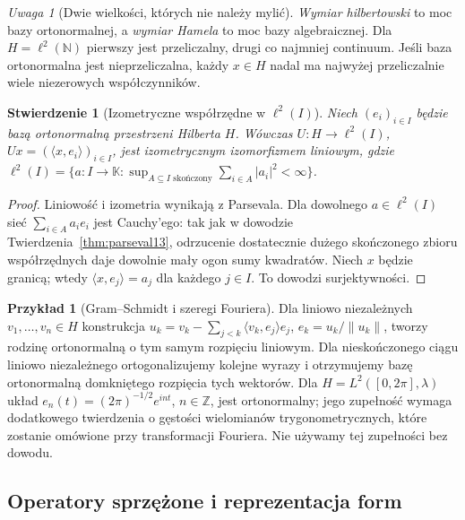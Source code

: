 \documentclass[11pt,a4paper]{article}
\numberwithin{equation}{section}
\theoremstyle{plain}
\newtheorem{stwierdzenie}[twierdzenie]{Stwierdzenie}
\theoremstyle{definition}
\newtheorem{przyklad}[twierdzenie]{Przykład}
\theoremstyle{remark}
\newtheorem{uwaga}[twierdzenie]{Uwaga}
\newcommand{\N}{\mathbb N}
\newcommand{\K}{\mathbb K}
\begin{document}
\begin{uwaga}[Dwie wielkości, których nie należy mylić]
\label{rem:hamel-vs-hilbert13}
\emph{Wymiar hilbertowski} to moc bazy ortonormalnej,
a \emph{wymiar Hamela} to moc bazy algebraicznej.
Dla $H=\ell^2(\N)$ pierwszy jest przeliczalny, drugi
co najmniej continuum. Jeśli baza ortonormalna jest
nieprzeliczalna, każdy $x\in H$ nadal ma najwyżej
przeliczalnie wiele niezerowych współczynników.
\end{uwaga}

\begin{stwierdzenie}[Izometryczne współrzędne w $\ell^2(I)$]
\label{prop:hilbert-l2I13}
Niech $(e_i)_{i\in I}$ będzie bazą ortonormalną przestrzeni
Hilberta $H$. Wówczas $U:H\to\ell^2(I)$,
$Ux=(\langle x,e_i\rangle)_{i\in I}$, jest izometrycznym
izomorfizmem liniowym, gdzie
$\ell^2(I)=\{a:I\to\K:\sup_{A\subseteq I\text{ skończony}}
\sum_{i\in A}|a_i|^2<\infty\}$.
\end{stwierdzenie}
\begin{proof}
Liniowość i izometria wynikają z Parsevala. Dla dowolnego
$a\in\ell^2(I)$ sieć $\sum_{i\in A}a_ie_i$ jest Cauchy'ego:
tak jak w dowodzie Twierdzenia~\ref{thm:parseval13},
odrzucenie dostatecznie dużego skończonego zbioru współrzędnych
daje dowolnie mały ogon sumy kwadratów. Niech $x$ będzie granicą;
wtedy $\langle x,e_j\rangle=a_j$ dla każdego $j\in I$.
To dowodzi surjektywności.
\end{proof}

\begin{przyklad}[Gram--Schmidt i szeregi Fouriera]
\label{ex:gram-schmidt13}
Dla liniowo niezależnych $v_1,\ldots,v_n\in H$ konstrukcja
$u_k=v_k-\sum_{j<k}\langle v_k,e_j\rangle e_j$,
$e_k=u_k/\|u_k\|$, tworzy rodzinę ortonormalną o tym samym
rozpięciu liniowym. Dla nieskończonego ciągu liniowo niezależnego
ortogonalizujemy kolejne wyrazy i otrzymujemy bazę ortonormalną domkniętego rozpięcia tych wektorów. Dla $H=L^2([0,2\pi],\lambda)$
układ $e_n(t)=(2\pi)^{-1/2}e^{int}$, $n\in\mathbb Z$, jest
ortonormalny; jego zupełność wymaga dodatkowego twierdzenia
o gęstości wielomianów trygonometrycznych, które zostanie
omówione przy transformacji Fouriera. Nie używamy tej zupełności
bez dowodu.
\end{przyklad}

\subsection{Operatory sprzężone i reprezentacja form}
\end{document}
